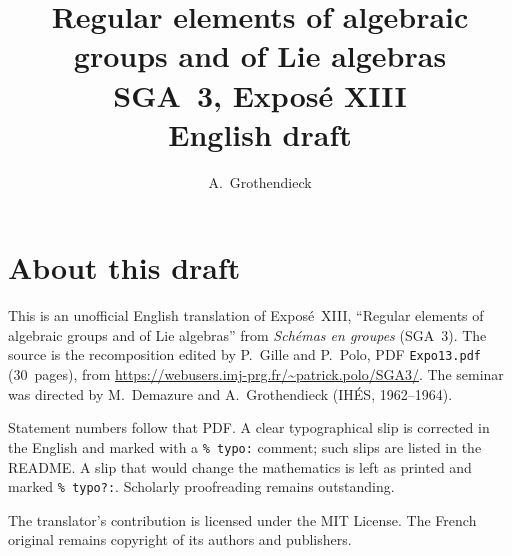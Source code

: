 \documentclass[11pt,a4paper,oneside]{amsbook}
\title[SGA~3, Expos\'e XIII (English draft)]{Regular elements of algebraic groups and of Lie algebras\\
{\normalsize SGA~3, Expos\'e XIII\\English draft}}
\author{A.\ Grothendieck}
\date{}
\begin{document}
\frontmatter
\maketitle

\chapter*{About this draft}
This is an unofficial English translation of Expos\'e~XIII, ``Regular elements of algebraic groups and of Lie algebras''
from \textit{Sch\'emas en groupes} (SGA~3).
The source is the recomposition edited by P.~Gille and P.~Polo,
PDF \texttt{Expo13.pdf} (30~pages),
from \url{https://webusers.imj-prg.fr/~patrick.polo/SGA3/}.
The seminar was directed by M.~Demazure and A.~Grothendieck
(IH\'ES, 1962--1964).

Statement numbers follow that PDF. A clear typographical slip is
corrected in the English and marked with a \texttt{\% typo:} comment;
such slips are listed in the README. A slip that would change the
mathematics is left as printed and marked \texttt{\% typo?:}.
Scholarly proofreading remains outstanding.

The translator's contribution is licensed under the MIT License.
The French original remains copyright of its authors and publishers.

\tableofcontents
\mainmatter





\end{document}
